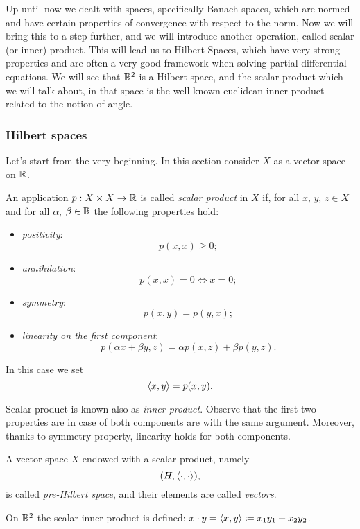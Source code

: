 Up until now we dealt with spaces, specifically Banach spaces, which are normed and have certain properties of convergence with respect to the norm. Now we will bring this to a step further, and we will introduce another operation, called scalar (or inner) product. This will lead us to Hilbert Spaces, which have very strong properties and are often a very good framework when solving partial differential equations. We will see that $\mathbb R^2$ is a Hilbert space, and the scalar product which we will talk about, in that space is the well known euclidean inner product related to the notion of angle.

\subsubsection{Hilbert spaces}

Let's start from the very beginning. In this section consider $X$ as a vector space on $\mathbb R$.

\begin{defn}
	An application $p: X \times X \to \mathbb R$ is called \emph{scalar product} in $X$ if, for all $x$, $y$, $z \in X$ and for all $\alpha$, $\beta \in \mathbb R$ the following properties hold:
	\begin{itemize}
		\item \emph{positivity}:
		$$p(x,x) \geq 0;$$
		\item \emph{annihilation}:
		$$p(x,x) = 0 \iff x=0;$$
		\item \emph{symmetry}:
		$$p(x,y) = p(y,x);$$
		\item \emph{linearity on the first component}:
		$$p(\alpha x + \beta y, z) = \alpha p(x,z) + \beta p(y, z).$$
	\end{itemize}
	In this case we set $$\left\langle x, y\right\rangle = p(x,y).$$
\end{defn}
Scalar product is known also as \emph{inner product}.
Observe that the first two properties are in case of both components are with the same argument. Moreover, thanks to symmetry property, linearity holds for both components.

\begin{defn}
	A vector space $X$ endowed with a scalar product, namely 
	$$(H, \left\langle\cdot, \cdot\right\rangle),$$
	is called \emph{pre-Hilbert space}, and their elements are called \emph{vectors}.
\end{defn}

On $\mathbb R^2$ the scalar inner product is defined: $x \cdot y = \left\langle x, y\right\rangle \coloneqq x_1 y_1 + x_2 y_2$.

